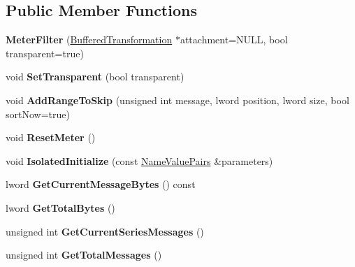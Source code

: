 \subsection*{Public Member Functions}
\begin{DoxyCompactItemize}
\item 
\hypertarget{class_meter_filter_a6d458e027fdc3b9a481a633ae04459d2}{
{\bfseries MeterFilter} (\hyperlink{class_buffered_transformation}{BufferedTransformation} $\ast$attachment=NULL, bool transparent=true)}
\label{class_meter_filter_a6d458e027fdc3b9a481a633ae04459d2}

\item 
\hypertarget{class_meter_filter_ad6f0f8c7bbc82fefb44c3c4747e3d3e9}{
void {\bfseries SetTransparent} (bool transparent)}
\label{class_meter_filter_ad6f0f8c7bbc82fefb44c3c4747e3d3e9}

\item 
\hypertarget{class_meter_filter_a58898a4bba38196c8432b8b5d324b671}{
void {\bfseries AddRangeToSkip} (unsigned int message, lword position, lword size, bool sortNow=true)}
\label{class_meter_filter_a58898a4bba38196c8432b8b5d324b671}

\item 
\hypertarget{class_meter_filter_a59c4b05b453ad56ed42b6951ab986db0}{
void {\bfseries ResetMeter} ()}
\label{class_meter_filter_a59c4b05b453ad56ed42b6951ab986db0}

\item 
\hypertarget{class_meter_filter_a141a6f8b09072847dbdd6a3f0f33f865}{
void {\bfseries IsolatedInitialize} (const \hyperlink{class_name_value_pairs}{NameValuePairs} \&parameters)}
\label{class_meter_filter_a141a6f8b09072847dbdd6a3f0f33f865}

\item 
\hypertarget{class_meter_filter_af3d77b4d8f9865fd0f0edf66bf9863eb}{
lword {\bfseries GetCurrentMessageBytes} () const }
\label{class_meter_filter_af3d77b4d8f9865fd0f0edf66bf9863eb}

\item 
\hypertarget{class_meter_filter_a822e573c89bf1a905f2d86f25af1344a}{
lword {\bfseries GetTotalBytes} ()}
\label{class_meter_filter_a822e573c89bf1a905f2d86f25af1344a}

\item 
\hypertarget{class_meter_filter_ae04af1de9800400ad830cbcfbde39616}{
unsigned int {\bfseries GetCurrentSeriesMessages} ()}
\label{class_meter_filter_ae04af1de9800400ad830cbcfbde39616}

\item 
\hypertarget{class_meter_filter_a62bcc765c811853ab695f6e03920b2c7}{
unsigned int {\bfseries GetTotalMessages} ()}
\label{class_meter_filter_a62bcc765c811853ab695f6e03920b2c7}


\end{DoxyCompactItemize}
